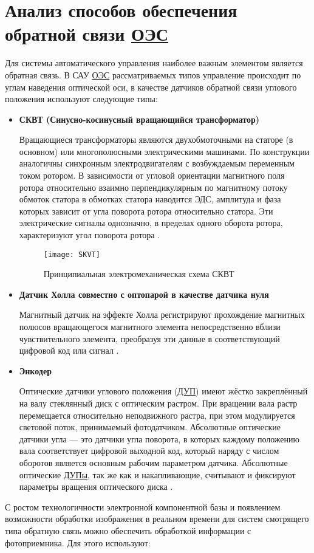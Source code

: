 \section{Анализ способов обеспечения обратной связи \hyperref[acroEOS]{ОЭС}} \label{sec:ch1/sec3-}

Для системы автоматического управления наиболее важным элементом является обратная связь. В САУ  \hyperref[acroEOS]{ОЭС} рассматриваемых типов управление происходит по углам наведения оптической оси, в качестве датчиков обратной связи углового положения используют следующие типы:
\begin{itemize}
	\item \textbf{СКВТ (Синусно-косинусный вращающийся трансформатор)}
	
	Вращающиеся трансформаторы являются двухобмоточными на статоре (в основном) или многополюсными электрическими машинами. По конструкции аналогичны синхронным электродвигателям с возбуждаемым переменным током ротором. В зависимости от угловой ориентации магнитного поля ротора относительно взаимно перпендикулярным по магнитному потоку обмоток статора в обмотках статора наводится ЭДС, амплитуда и фаза которых зависит от угла поворота ротора относительно статора. Эти электрические сигналы однозначно, в пределах одного оборота ротора, характеризуют угол поворота ротора \cite[]{SKVT}.
	
	\begin{figure}[ht]
		\centering
		\texttt{[image: SKVT]} 
		\caption{Принципиальная электромеханическая схема СКВТ \cite[]{1310HM025}}
		\label{fig:SKVT}
	\end{figure}
	
	\item \textbf{Датчик Холла совместно с оптопарой в качестве датчика нуля}

	Магнитный датчик на эффекте Холла регистрируют прохождение магнитных полюсов вращающегося магнитного элемента непосредственно вблизи чувствительного элемента, преобразуя эти данные в соответствующий цифровой код или сигнал \cite[]{Encoder}.
	
	\item \textbf{Энкодер}
	
	Оптические датчики углового положения (\hyperref[acroDUP]{ДУП}) имеют жёстко закреплённый на валу стеклянный диск с оптическим растром. При вращении вала растр перемещается относительно неподвижного растра, при этом модулируется световой поток, принимаемый фотодатчиком. Абсолютные оптические датчики угла — это датчики угла поворота, в которых каждому положению вала соответствует цифровой выходной код, который наряду с числом оборотов является основным рабочим параметром датчика. Абсолютные оптические \hyperref[acroDUP]{ДУПы}, так же как и накапливающие, считывают и фиксируют параметры вращения оптического диска \cite[]{Encoder}.
	
\end{itemize}
С ростом технологичности электронной компонентной базы и появлением возможности обработки изображения в реальном времени для систем смотрящего типа обратную связь можно обеспечить обработкой информации с фотоприемника. Для этого используют:

